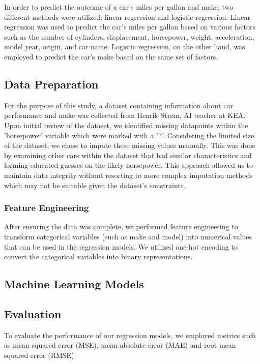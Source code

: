\documentclass[a4paper, twocolumn]{article}
\begin{document}
In order to predict the outcome of a car's miles per gallon and make, two different methods were utilized: linear regression and logistic regression. Linear regression was used to predict the car's miles per gallon based on various factors such as the number of cylinders, displacement, horsepower, weight, acceleration, model year, origin, and car name. Logistic regression, on the other hand, was employed to predict the car's make based on the same set of factors.

\subsection{Data Preparation}

For the purpose of this study, a dataset containing information about car performance and make was collected from Henrik Strøm, AI teacher at KEA. Upon initial review of the dataset, we identified missing datapoints within the 'horsepower' variable which were marked with a '?'. Considering the limited size of the dataset, we chose to impute these missing values manually. This was done by examining other cars within the dataset that had similar characteristics and forming educated guesses on the likely horsepower. This approach allowed us to maintain data integrity without resorting to more complex imputation methods which may not be suitable given the dataset's constraints.

\subsubsection{Feature Engineering}

After ensuring the data was complete, we performed feature engineering to transform categorical variables (such as make and model) into numerical values that can be used in the regression models. We utilized one-hot encoding to convert the categorical variables into binary representations.

\subsection{Machine Learning Models}

\subsection{Evaluation}
To evaluate the performance of our regression models, we employed metrics such as mean squared error (MSE), mean absolute error (MAE) and root mean squared error (RMSE)
\end{document}
